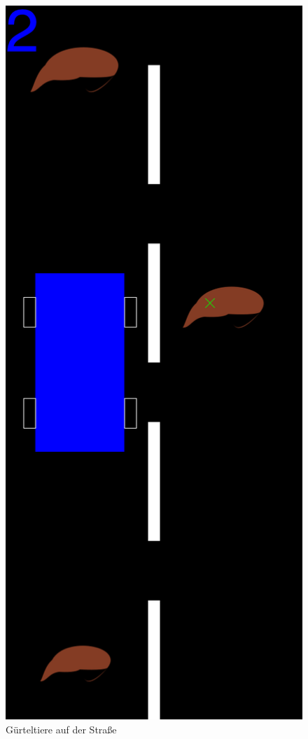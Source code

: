 \begin{figure}[tb]
  \centering
  \includegraphics[height=0.4\textheight]{i1world/dillo-world}
  \caption{Gürteltiere auf der Straße}
  \label{fig:dillo-world}
\end{figure}

